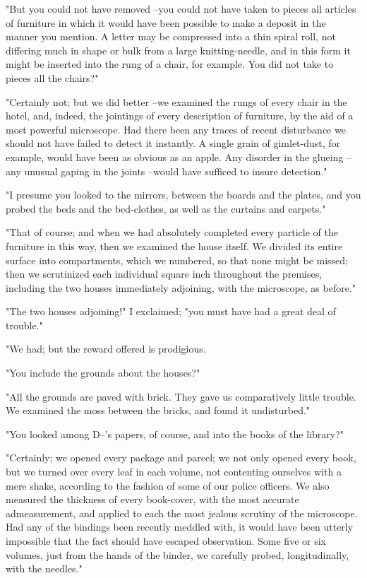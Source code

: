 \documentclass{article}
\begin{document}
"But you could not have removed --you could not have taken to pieces all articles of furniture in which it would have been possible to make a deposit in the manner you mention. A letter may be compressed into a thin spiral roll, not differing much in shape or bulk from a large knitting-needle, and in this form it might be inserted into the rung of a chair, for example. You did not take to pieces all the chairs?"

"Certainly not; but we did better --we examined the rungs of every chair in the hotel, and, indeed, the jointings of every description of furniture, by the aid of a most powerful microscope. Had there been any traces of recent disturbance we should not have failed to detect it instantly. A single grain of gimlet-dust, for example, would have been as obvious as an apple. Any disorder in the glueing --any unusual gaping in the joints --would have sufficed to insure detection."

"I presume you looked to the mirrors, between the boards and the plates, and you probed the beds and the bed-clothes, as well as the curtains and carpets."

"That of course; and when we had absolutely completed every particle of the furniture in this way, then we examined the house itself. We divided its entire surface into compartments, which we numbered, so that none might be missed; then we scrutinized each individual square inch throughout the premises, including the two houses immediately adjoining, with the microscope, as before."

"The two houses adjoining!" I exclaimed; "you must have had a great deal of trouble."

"We had; but the reward offered is prodigious.

"You include the grounds about the houses?"

"All the grounds are paved with brick. They gave us comparatively little trouble. We examined the moss between the bricks, and found it undisturbed."

"You looked among D--'s papers, of course, and into the books of the library?"

"Certainly; we opened every package and parcel; we not only opened every book, but we turned over every leaf in each volume, not contenting ourselves with a mere shake, according to the fashion of some of our police officers. We also measured the thickness of every book-cover, with the most accurate admeasurement, and applied to each the most jealous scrutiny of the microscope. Had any of the bindings been recently meddled with, it would have been utterly impossible that the fact should have escaped observation. Some five or six volumes, just from the hands of the binder, we carefully probed, longitudinally, with the needles."
\end{document}
